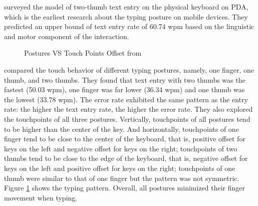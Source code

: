 \documentclass[11pt]{article}
\begin{document}
\citet{twothumb2002} surveyed the model of two-thumb text entry on the physical keyboard on PDA, which is the earliest research about the typing posture on mobile devices. They predicted an upper bound of text entry rate of 60.74 wpm based on the linguistic and motor component of the interaction.

\begin{figure}[H]
\centering
{}\hfill
{}\hfill
\caption{Postures VS Touch Points Offset from \citep{10.1145/2371574.2371612}} \label{fig:posture}
\end{figure}

\citet{10.1145/2371574.2371612} compared the touch behavior of different typing postures, namely, one finger, one thumb, and two thumbs. They found that text entry with two thumbs was the fastest (50.03 wpm), one finger was far lower (36.34 wpm) and one thumb was the lowest (33.78 wpm). The error rate exhibited the same pattern as the entry rate: the higher the text entry rate, the higher the error rate. They also explored the touchpoints of all three postures. Vertically, touchpoints of all postures tend to be higher than the center of the key. And horizontally, touchpoints of one finger tend to be close to the center of the keyboard, that is, positive offset for keys on the left and negative offset for keys on the right; touchpoints of two thumbs tend to be close to the edge of the keyboard, that is, negative offset for keys on the left and positive offset for keys on the right; touchpoints of one thumb were similar to that of one finger but the pattern was not symmetric. Figure \ref{fig:posture} shows the typing pattern. Overall, all postures minimized their finger movement when typing. 
\end{document}
